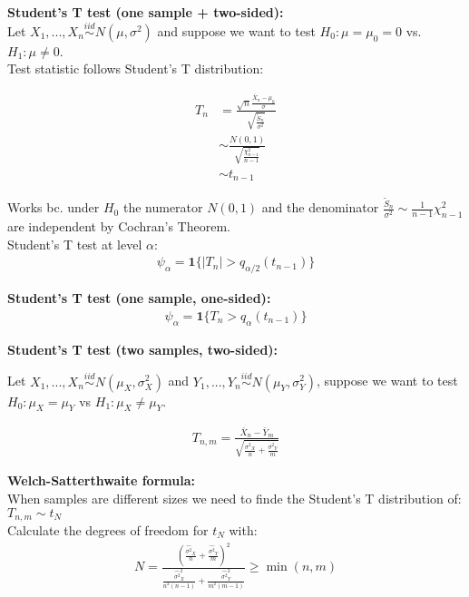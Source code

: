 \textbf{Student's T test (one sample + two-sided):}\\

Let $X_1, ..., X_n \stackrel{iid}{\sim} N(\mu,\sigma^2)$ and suppose we want to test $H_0: \mu = \mu_0 = 0$ vs. $H_1: \mu \neq 0$.\\

Test statistic follows Student's T distribution:

\begin{align*}
T_n &= \frac{\displaystyle \sqrt{n}\frac{\bar{X}_n - \mu_0}{\sigma}}{\displaystyle \sqrt{\frac{\tilde{S}_n}{\sigma^2}}}\\
&\sim \frac{N(0,1)}{\sqrt{\frac{\chi^2_{n-1}}{n-1}}}\\
&\sim t_{n-1}
\end{align*}

Works bc. under $H_0$ the numerator $N(0,1)$ and the denominator $\frac{\tilde{S}_n}{\sigma^2} \sim \frac1{n-1}\chi^2_{n-1}$ are independent by Cochran's Theorem.\\

Student's T test at level $\alpha$:
\begin{align*}
\psi_\alpha = \textbf{1}\{|T_n| > q_{\alpha/2}(t_{n-1})\}
\end{align*}

\textbf{Student's T test (one sample, one-sided):}
\begin{align*}
\psi_\alpha = \textbf{1}\{T_n > q_\alpha(t_{n-1})\}
\end{align*}

\textbf{Student's T test (two samples, two-sided):}

Let $X_1, ..., X_n \stackrel{iid}{\sim} N(\mu_X,\sigma^2_X)$ and $Y_1, ..., Y_n \stackrel{iid}{\sim} N(\mu_Y,\sigma^2_Y)$, suppose we want to test $H_0: \mu_X = \mu_Y$ vs $H_1: \mu_X \neq \mu_Y$.

\begin{align*}
T_{n, m} = \frac{\bar{X}_n - \bar{Y}_m}{\displaystyle \sqrt{\frac{\hat{\sigma^2}_X}n + \frac{\hat{\sigma^2}_Y}m}}
\end{align*}


\textbf{Welch-Satterthwaite formula:}\\

When samples are different sizes we need to finde the Student's T distribution of: $T_{n, m} \sim t_N$\\

Calculate the degrees of freedom for $t_N$ with:
\begin{align*}
N = \frac{\displaystyle \left(\frac{\hat{\sigma^2}_X}n + \frac{\hat{\sigma^2}_Y}m\right)^2}{\displaystyle \frac{\hat{\sigma^2}^2_X}{n^2(n-1)} + \frac{\hat{\sigma^2}^2_Y}{m^2(m-1)}} \geq \min(n, m)
\end{align*}

